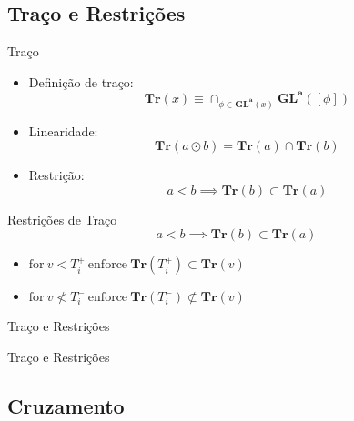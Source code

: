 \documentclass{beamer}
\begin{document}
\subsection{Traço e Restrições}
\begin{frame}{Traço}
\begin{itemize}
    \item<1-> Definição de traço:
        \[\mathbf{Tr}(x) \equiv \cap_{\phi \in \mathbf{GL^a}(x)} \mathbf{GL^{a}}([\phi]) \]
    \item<2-> Linearidade:
        \[\mathbf{Tr}(a \odot b) = \mathbf{Tr}(a) \cap \mathbf{Tr}(b)\]
    \item<3-> Restrição:
        \[ a < b \implies \mathbf{Tr}(b) \subset \mathbf{Tr}(a)\]
\end{itemize}
\end{frame}
\begin{frame}{Restrições de Traço}
\[ a < b \implies \mathbf{Tr}(b) \subset \mathbf{Tr}(a)\]
\begin{itemize}
    \item<1-> $\mathrm{for}~v < T_i^+~\mathrm{enforce}~
    \mathbf{Tr}(T_i^+) \subset \mathbf{Tr}(v) $
    \item<2-> $\mathrm{for}~v \not< T_i^-~\mathrm{enforce}~
    \mathbf{Tr}(T_i^-) \not\subset \mathbf{Tr}(v) $
\end{itemize}
\end{frame}
\begin{frame}{Traço e Restrições}
\centering
    
\end{frame}
\begin{frame}{Traço e Restrições}
\centering
    
\end{frame}
\subsection{Cruzamento}
\begin{frame}{\subsecname}
\centering
    
\end{frame}
\begin{frame}{\subsecname}
\centering
    
\end{frame}
\end{document}
